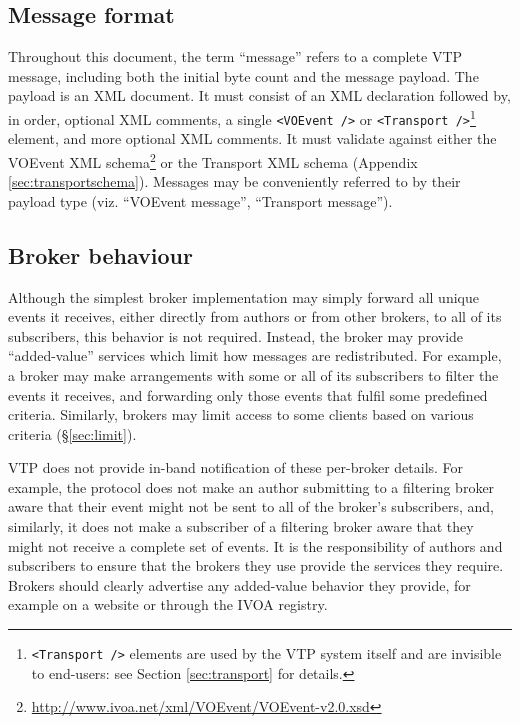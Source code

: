 \documentclass[a4paper,11pt]{ivoa}
\begin{document}
\subsection{Message format}
\label{sec:common:format}

Throughout this document, the term ``message'' refers to a complete VTP
message, including both the initial byte count and the message payload.  The
payload is an XML document. It must consist of an XML declaration followed by,
in order, optional XML comments, a single \texttt{<VOEvent~/>} or
\texttt{<Transport~/>}\footnote{ \texttt{<Transport~/>} elements are used by
the VTP system itself and are invisible to end-users: see Section
\ref{sec:transport} for details.} element, and more optional XML comments. It
must validate against either the VOEvent XML
schema\footnote{\url{http://www.ivoa.net/xml/VOEvent/VOEvent-v2.0.xsd}} or the
Transport XML schema (Appendix \ref{sec:transportschema}). Messages may be
conveniently referred to by their payload type (viz. ``VOEvent message'',
``Transport message'').

\subsection{Broker behaviour}
\label{sec:common:broker}

Although the simplest broker implementation may simply forward all unique
events it receives, either directly from authors or from other brokers, to all
of its subscribers, this behavior is not required. Instead, the broker may
provide ``added-value'' services which limit how messages are redistributed.
For example, a broker may make arrangements with some or all of its
subscribers to filter the events it receives, and forwarding only those events
that fulfil some predefined criteria. Similarly, brokers may limit access to
some clients based on various criteria (\S\ref{sec:limit}).

VTP does not provide in-band notification of these per-broker details. For
example, the protocol does not make an author submitting to a filtering broker
aware that their event might not be sent to all of the broker's subscribers,
and, similarly, it does not make a subscriber of a filtering broker aware that
they might not receive a complete set of events. It is the responsibility of
authors and subscribers to ensure that the brokers they use provide the
services they require. Brokers should clearly advertise any added-value
behavior they provide, for example on a website or through the IVOA registry.
\end{document}
